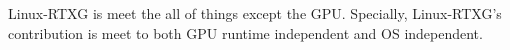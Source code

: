 
Linux-RTXG is meet the all of things except the GPU.
Specially, Linux-RTXG's contribution is meet to both GPU runtime independent and OS independent.
